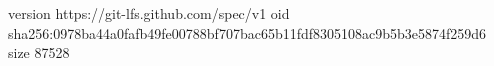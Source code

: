 version https://git-lfs.github.com/spec/v1
oid sha256:0978ba44a0fafb49fe00788bf707bac65b11fdf8305108ac9b5b3e5874f259d6
size 87528
